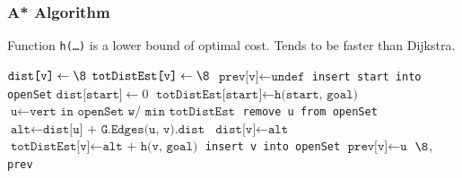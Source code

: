 \subsubsection{A* Algorithm}
Function \texttt{h(\dots)} is a lower bound of optimal cost.
Tends to be faster than Dijkstra.
\begin{algorithm}
    \small
    \begin{algorithmic}[1]
                \State $\texttt{dist[v]} \gets \8$
                \State $\texttt{totDistEst[v]} \gets \8$
                \State $\texttt{prev[v]} \gets \texttt{undef}$
            \EndFor
            \State \texttt{insert start into openSet}
            \State $\texttt{dist[start]} \gets 0$
            \State $\texttt{totDistEst[start]} \gets \texttt{h(start, goal)}$
                \State $\texttt{u} \gets \texttt{vert in openSet w/ min totDistEst}$
                \State \texttt{remove u from openSet}
                    \State {}
                \EndIf
                    \State $\texttt{alt} \gets \texttt{dist[u] + G.Edges(u, v).dist}$
                        \State $\texttt{dist[v]} \gets \texttt{alt}$
                        \State $\texttt{totDistEst[v]} \gets \texttt{alt + h(v, goal)}$
                        \State \texttt{insert v into openSet}
                        \State $\texttt{prev[v]} \gets \texttt{u}$
                    \EndIf
                \EndFor
            \EndWhile
            \State \Return $\8$, \texttt{prev}
        \EndProcedure
    \end{algorithmic}
\end{algorithm}

